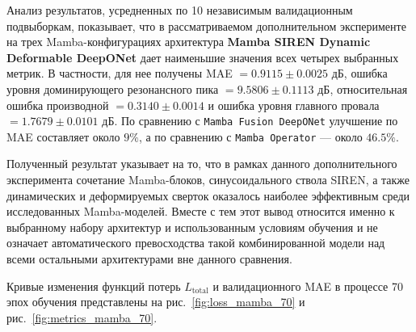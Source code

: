\begin{table}[H]
    \centering
    \caption{Сравнение нейросетевых моделей на основе Mamba при длительном обучении (70 эпох); приведены результаты отдельной итоговой оценки в виде средних значений и стандартных отклонений метрик по 10 независимым валидационным подвыборкам}
    \label{tab:mamba_70_comparison}
\end{table}

Анализ результатов, усредненных по 10 независимым валидационным подвыборкам, показывает, что в рассматриваемом дополнительном эксперименте на трех Mamba-конфигурациях архитектура \textbf{Mamba SIREN Dynamic Deformable DeepONet} дает наименьшие значения всех четырех выбранных метрик. В частности, для нее получены MAE $= 0.9115 \pm 0.0025$ дБ, ошибка уровня доминирующего резонансного пика $= 9.5806 \pm 0.1113$ дБ, относительная ошибка производной $= 0.3140 \pm 0.0014$ и ошибка уровня главного провала $= 1.7679 \pm 0.0101$ дБ. По сравнению с \texttt{Mamba Fusion DeepONet} улучшение по MAE составляет около $9\%$, а по сравнению с \texttt{Mamba Operator} --- около $46.5\%$.

Полученный результат указывает на то, что в рамках данного дополнительного эксперимента сочетание Mamba-блоков, синусоидального ствола SIREN, а также динамических и деформируемых сверток оказалось наиболее эффективным среди исследованных Mamba-моделей. Вместе с тем этот вывод относится именно к выбранному набору архитектур и использованным условиям обучения и не означает автоматического превосходства такой комбинированной модели над всеми остальными архитектурами вне данного сравнения.

Кривые изменения функций потерь $L_{\text{total}}$ и валидационного MAE в процессе 70 эпох обучения представлены на рис.~\ref{fig:loss_mamba_70} и рис.~\ref{fig:metrics_mamba_70}.

